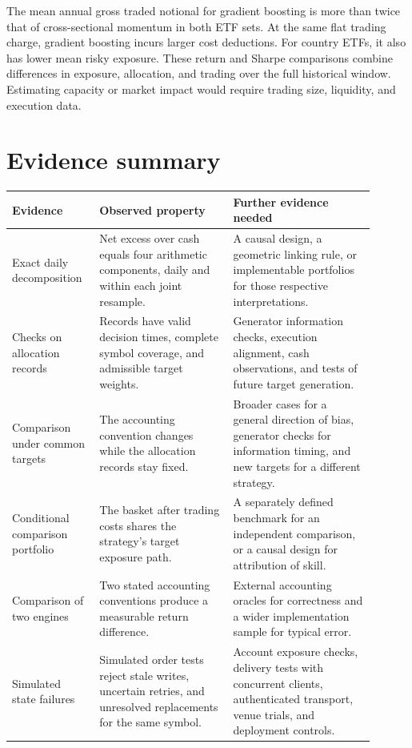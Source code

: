 \documentclass{article}
\newif\ifquantcortexreview
\begin{document}
The mean annual gross traded notional for gradient boosting is more than twice that of cross-sectional momentum in both ETF sets. At the same flat trading charge, gradient boosting incurs larger cost deductions. For country ETFs, it also has lower mean risky exposure. These return and Sharpe comparisons combine differences in exposure, allocation, and trading over the full historical window. Estimating capacity or market impact would require trading size, liquidity, and execution data.

\par\medskip\noindent
\begin{minipage}{\textwidth}
\section{Evidence summary}
\label{app:evidence}

\begin{center}
\begin{tabular}{>{\raggedright\arraybackslash}p{0.20\linewidth}
                >{\raggedright\arraybackslash}p{0.34\linewidth}
                >{\raggedright\arraybackslash}p{0.36\linewidth}}
  \toprule
  Evidence & Observed property & Further evidence needed \\
  \midrule
  Exact daily decomposition & Net excess over cash equals four arithmetic components, daily and within each joint resample. & A causal design, a geometric linking rule, or implementable portfolios for those respective interpretations. \\
  Checks on allocation records & Records have valid decision times, complete symbol coverage, and admissible target weights. & Generator information checks, execution alignment, cash observations, and tests of future target generation. \\
  Comparison under common targets & The accounting convention changes while the allocation records stay fixed. & Broader cases for a general direction of bias, generator checks for information timing, and new targets for a different strategy. \\
  Conditional comparison portfolio & The basket after trading costs shares the strategy's target exposure path. & A separately defined benchmark for an independent comparison, or a causal design for attribution of skill. \\
  Comparison of two engines & Two stated accounting conventions produce a measurable return difference. & External accounting oracles for correctness and a wider implementation sample for typical error. \\
  Simulated state failures & Simulated order tests reject stale writes, uncertain retries, and unresolved replacements for the same symbol. & Account exposure checks, delivery tests with concurrent clients, authenticated transport, venue trials, and deployment controls. \\
  \bottomrule
\end{tabular}
\end{center}
\end{minipage}

\ifquantcortexreview
  \clearpage
  
\fi
\end{document}

